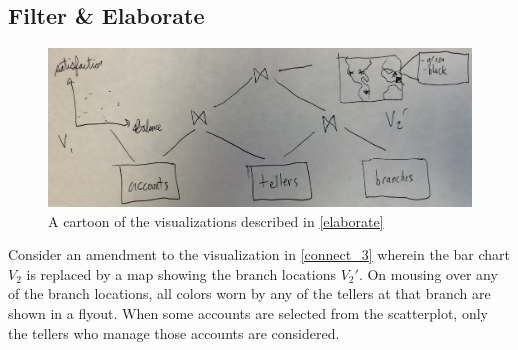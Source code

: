 \subsection{Filter \& Elaborate}\label{elaborate}
\begin{figure}[H]
	\includegraphics[width=\columnwidth]{figures/elaborate}
	\caption{A cartoon of the visualizations described in \autoref{elaborate}
	}
	\label{fig_elaborate}
\end{figure}
Consider an amendment to the visualization in \autoref{connect_3} wherein the bar chart $V_2$ is replaced by a map showing the branch locations $V_2'$.
On mousing over any of the branch locations, all colors worn by any of the tellers at that branch are shown in a flyout.
When some accounts are selected from the scatterplot, only the tellers who manage those accounts are considered.
